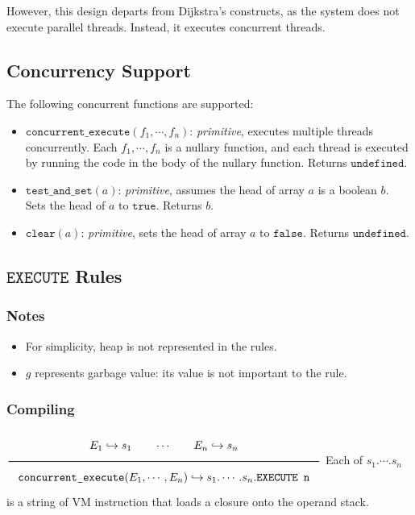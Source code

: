 However, this design departs from Dijkstra's constructs, as the system does not execute parallel threads. Instead, it executes concurrent threads.

\subsection{Concurrency Support}
\label{sec:orga25444d}
The following concurrent functions are supported:
\begin{itemize}
\item \(\texttt{concurrent\_execute}(f_1, \cdots ,f_n)\): \textit{primitive}, executes multiple threads concurrently. Each \(f_1, \cdots ,f_n\) is a nullary function, and each thread is executed by running the code in the body of the nullary function. Returns \(\texttt{undefined}\).
\item \(\texttt{test\_and\_set}(a)\): \textit{primitive}, assumes the head of array \(a\) is a boolean \(b\). Sets the head of \(a\) to \(\texttt{true}\). Returns \(b\).
\item \(\texttt{clear}(a)\): \textit{primitive}, sets the head of array \(a\) to \(\texttt{false}\). Returns \(\texttt{undefined}\).
\end{itemize}

\subsection{\(\texttt{EXECUTE}\) Rules}
\label{sec:orga76ff96}

\subsubsection{Notes}
\label{sec:org406dee3}
\begin{itemize}
\item For simplicity, heap is not represented in the rules.
\item \(g\) represents garbage value: its value is not important to the rule.
\end{itemize}

\subsubsection{Compiling}
\label{sec:org536d6c2}
\(\Rule{E_1 \translateaux s_1 \qquad \cdots \qquad E_n \translateaux s_n}{\texttt{concurrent\_execute}(E_1, \cdots , E_n) \translateaux s_1. \cdots .s_n.\texttt{EXECUTE n}}\\\)
Each of \(s_1. \cdots .s_n\) is a string of VM instruction that loads a closure onto the operand stack.

